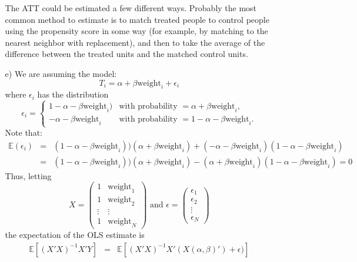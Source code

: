 \documentclass{article}
\def\E{{\mathbb E}}
\begin{document}
\begin{itemize}
\begin{itemize}
       The ATT could be estimated a few different ways. 
       Probably the most common method to estimate is to
       match treated people to control people using the propensity score in some way
       (for example, by matching to the nearest neighbor with replacement), 
       and then
       to take the average of the difference between 
       the treated units and the matched control units.
     \item[e)] We are assuming the model:
     $$
       T_i = \alpha + \beta\text{weight}_i + \epsilon_i
     $$
     where $\epsilon_i$ has the distribution
     $$
       \epsilon_i = \left\{ 
         \begin{array}{ll}
           1-\alpha - \beta\text{weight}_i) & \text{with probability }=\alpha + \beta\text{weight}_i,\\
           -\alpha - \beta\text{weight}_i & \text{with probability } = 1 - \alpha -\beta\text{weight}_i.
         \end{array}
       \right.
     $$
     Note that:
     \begin{eqnarray*}
       \E(\epsilon_i) &=&  (1-\alpha - \beta\text{weight}_i))(\alpha + \beta\text{weight}_i)
       + ( -\alpha - \beta\text{weight}_i )(1 - \alpha -\beta\text{weight}_i) \\
       &=& (1-\alpha - \beta\text{weight}_i))(\alpha + \beta\text{weight}_i)
       - ( \alpha + \beta\text{weight}_i )(1 - \alpha -\beta\text{weight}_i) = 0
     \end{eqnarray*}
     Thus, letting 
     $$
       X = \left(
        \begin{array}{cc}
          1 & \text{weight}_1 \\
          1 & \text{weight}_2 \\
          \vdots & \vdots \\
          1 & \text{weight}_N
        \end{array}
      \right)
      \text{ and }
      \epsilon = \left(
        \begin{array}{c}
         \epsilon_1 \\
         \epsilon_2\\
         \vdots \\
         \epsilon_N
        \end{array}
      \right)
     $$ 
     the expectation of the OLS estimate is
     \begin{eqnarray*}
       \E[(X'X)^{-1}X'Y] &=& \E[(X'X)^{-1}X'(X(\alpha, \beta)') + \epsilon)]     \\

\end{eqnarray*}
\end{itemize}
\end{itemize}
\end{document}
